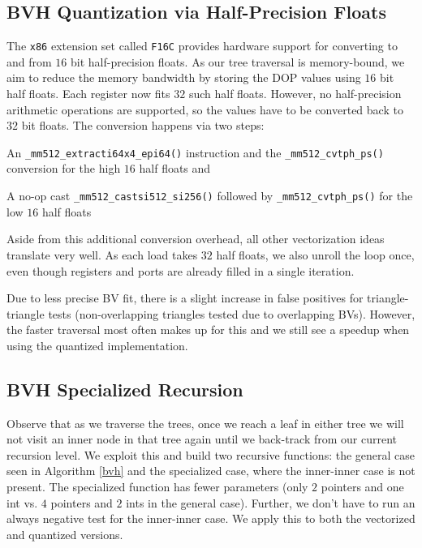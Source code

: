 \documentclass[twocolumn]{article}
\begin{document}
\subsection{BVH Quantization via Half-Precision Floats}
The \texttt{x86} extension set called \texttt{F16C} provides hardware support for converting to and from $16$ bit half-precision floats. 
As our tree traversal is memory-bound, we aim to reduce the memory bandwidth by storing the DOP values using $16$ bit half floats. 
Each register now fits $32$ such half floats.
However, no half-precision arithmetic operations are supported, so the values have to be converted back to $32$ bit floats.
The conversion happens via two steps: 
\begin{compactitem}
\item An \texttt{\_mm512\_extracti64x4\_epi64()} instruction and the \texttt{\_mm512\_cvtph\_ps()} conversion for the high $16$ half floats and
\item A no-op cast \texttt{\_mm512\_castsi512\_si256()} followed by \texttt{\_mm512\_cvtph\_ps()} for the low $16$ half floats 
\end{compactitem}
Aside from this additional conversion overhead, all other vectorization ideas translate very well.
As each load takes $32$ half floats, we also unroll the loop once, even though registers and ports are already filled in a single iteration.

Due to less precise BV fit, there is a slight increase in false positives for triangle-triangle tests (non-overlapping triangles tested due to overlapping BVs).
However, the faster traversal most often makes up for this and we still see a speedup when using the quantized implementation.

\subsection{BVH Specialized Recursion}
Observe that as we traverse the trees, once we reach a leaf in either tree we will not visit an inner node in that tree again until we back-track from our current recursion level.
We exploit this and build two recursive functions: the general case seen in Algorithm \ref{bvh} and the specialized case, where the inner-inner case is not present.
The specialized function has fewer parameters (only $2$ pointers and one int vs. $4$ pointers and $2$ ints in the general case).
Further, we don't have to run an always negative test for the inner-inner case.
We apply this to both the vectorized and quantized versions.
\end{document}
